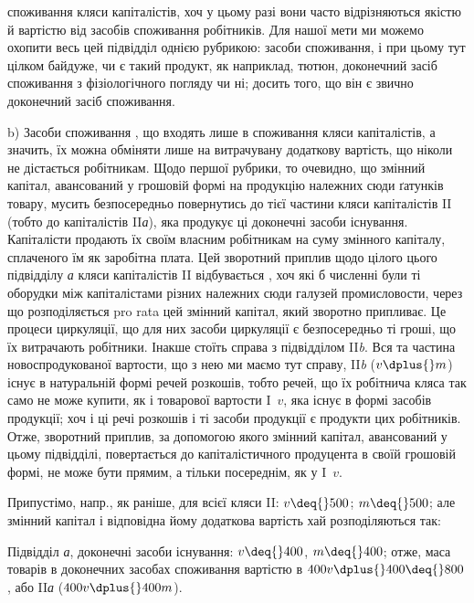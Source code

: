 \parcont{}  %
споживання кляси капіталістів, хоч у цьому разі вони часто відрізняються
якістю й вартістю від засобів споживання робітників. Для нашої мети
ми можемо охопити весь цей підвідділ однією рубрикою: 
засоби споживання, і при цьому тут цілком байдуже, чи є такий продукт,
як наприклад, тютюн, доконечний засіб споживання з фізіологічного
погляду чи ні; досить того, що він є звично доконечний засіб споживання.

b) Засоби споживання \deq{} , що входять лише в
споживання кляси капіталістів, а значить, їх можна обміняти лише на
витрачувану додаткову вартість, що ніколи не дістається робітникам.
Щодо першої рубрики, то очевидно, що змінний капітал, авансований у
грошовій формі на продукцію належних сюди ґатунків товару, мусить
безпосередньо повернутись до тієї частини кляси капіталістів II (тобто
до капіталістів II\emph{а}), яка продукує ці доконечні засоби існування.
Капіталісти продають їх своїм власним робітникам на суму змінного капіталу,
сплаченого їм як заробітна плата. Цей зворотний приплив щодо цілого
цього підвідділу \emph{а} кляси капіталістів II відбувається ,
хоч які б численні були ті оборудки між капіталістами різних належних
сюди галузей промисловости, через що розподіляється pro rata
цей змінний капітал, який зворотно припливає. Це процеси циркуляції,
що для них засоби циркуляції є безпосередньо ті гроші, що їх витрачають
робітники. Інакше стоїть справа з підвідділом II\emph{b}. Вся та частина
новоспродукованої вартости, що з нею ми маємо тут справу, II\emph{b} ($v \dplus{} m$)
існує в натуральній формі речей розкошів, тобто речей, що їх робітнича
кляса так само не може купити, як і товарової вартости I~$v$, яка існує
в формі засобів продукції; хоч і ці речі розкошів і ті засоби продукції
є продукти цих робітників. Отже, зворотний приплив, за допомогою
якого змінний капітал, авансований у цьому підвідділі, повертається до
капіталістичного продуцента в своїй грошовій формі, не може бути
прямим, а тільки посереднім, як у I~$v$.

\label{original-310}
Припустімо, напр., як раніше, для всієї кляси II: $v \deq{} 500$; $m \deq{} 500$;
але змінний капітал і відповідна йому додаткова вартість хай розподіляються
так:

Підвідділ \emph{а}, доконечні засоби існування: $v \deq{} 400$, $m \deq{} 400$; отже,
маса товарів в доконечних засобах споживання вартістю в $400 v \dplus{} 400 \deq{} 800$,
або II\emph{а} ($400 v \dplus{} 400 m$).

